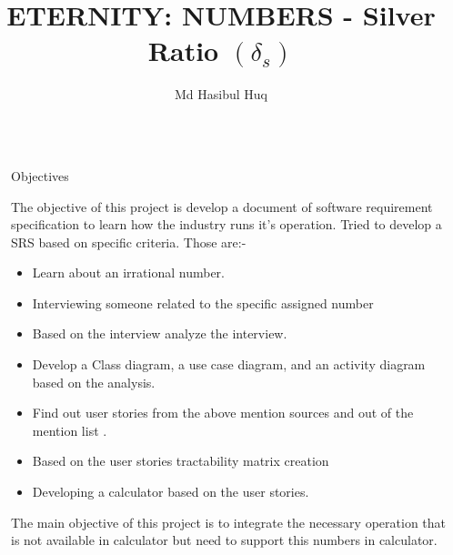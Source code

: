 \documentclass[final]{beamer}
\title{ETERNITY: NUMBERS - Silver Ratio $(\delta_s)$} %
\author{Md Hasibul Huq} %
\institute{Department of Computer Science and Software Engineering (CSSE) , Concordia University} %
\newlength{\sepwid}
\newlength{\onecolwid}
\begin{document}

\setlength{\belowcaptionskip}{2ex} %
\setlength\belowdisplayshortskip{2ex} %

\begin{frame}[t] %

\begin{columns}[t] %

\begin{column}{\sepwid}\end{column} %

\begin{column}{\onecolwid} %


\begin{alertblock}{Objectives}

The objective of this project is develop a document of software requirement specification to learn how the industry runs it's operation. Tried to develop a SRS  based on specific criteria. Those are:- 
\begin{itemize}
\item Learn about an irrational number.
\item Interviewing someone related to the specific assigned number
\item Based on the interview analyze the interview. 
\item Develop a Class diagram, a use case diagram, and an activity diagram based on the analysis.
\item Find out user stories from the above mention sources and out of the mention list .
\item Based on the user stories tractability matrix creation
\item Developing a calculator based on the user stories. 
\end{itemize}
The main objective of this project is to integrate the necessary  operation that is not available in calculator but need to support this numbers in calculator.
\end{alertblock}


\end{column}
\end{columns}
\end{frame}
\end{document}
